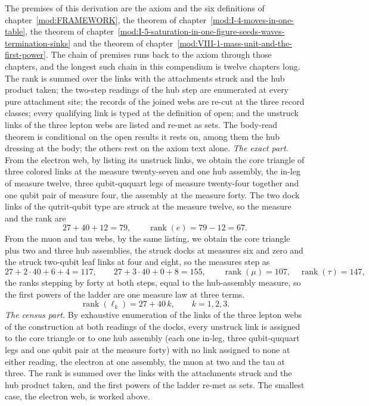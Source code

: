 \begin{chproof}
The premises of this derivation are the axiom and the six definitions of chapter~\ref{mod:FRAMEWORK}, the theorem of chapter~\ref{mod:I-4-moves-in-one-table}, the theorem of chapter~\ref{mod:I-5-saturation-in-one-figure-seeds-waves-termination-sinks} and the theorem of chapter~\ref{mod:VIII-1-mass-unit-and-the-first-power}. The chain of premises runs back to the axiom through those chapters, and the longest such chain in this compendium is twelve chapters long.
The rank is summed over the links with the attachments struck and the hub product taken; the two-step readings of the hub step are enumerated at every pure attachment site; the records of the joined webs are re-cut at the three record classes; every qualifying link is typed at the definition of open; and the unstruck links of the three lepton webs are listed and re-met as sets. The body-read theorem is conditional on the open results it rests on, among them the hub dressing at the body; the others rest on the axiom text alone.
\textit{The exact part.}
From the electron web, by listing its unstruck links, we obtain the core triangle of three colored links at the measure twenty-seven and one hub assembly, the in-leg of measure twelve, three qubit-ququart legs of measure twenty-four together and one qubit pair of measure four, the assembly at the measure forty. The two dock links of the qutrit-qubit type are struck at the measure twelve, so the measure and the rank are
\begin{equation}
27 + 40 + 12 = 79, \qquad \operatorname{rank}(e) = 79 - 12 = 67 .
\end{equation}
From the muon and tau webs, by the same listing, we obtain the core triangle plus two and three hub assemblies, the struck docks at measures six and zero and the struck two-qubit leaf links at four and eight, so the measures step as
\begin{equation}
27 + 2 \cdot 40 + 6 + 4 = 117, \qquad 27 + 3 \cdot 40 + 0 + 8 = 155, \qquad \operatorname{rank}(\mu) = 107, \quad \operatorname{rank}(\tau) = 147 ,
\end{equation}
the ranks stepping by forty at both steps, equal to the hub-assembly measure, so the first powers of the ladder are one measure law at three terms.
\begin{equation}
\operatorname{rank}(\ell_{k}) = 27 + 40\,k, \qquad k = 1, 2, 3 .
\end{equation}
\textit{The census part.}
By exhaustive enumeration of the links of the three lepton webs of the construction at both readings of the docks, every unstruck link is assigned to the core triangle or to one hub assembly (each one in-leg, three qubit-ququart legs and one qubit pair at the measure forty) with no link assigned to none at either reading, the electron at one assembly, the muon at two and the tau at three. The rank is summed over the links with the attachments struck and the hub product taken, and the first powers of the ladder re-met as sets. The smallest case, the electron web, is worked above.

\end{chproof}
